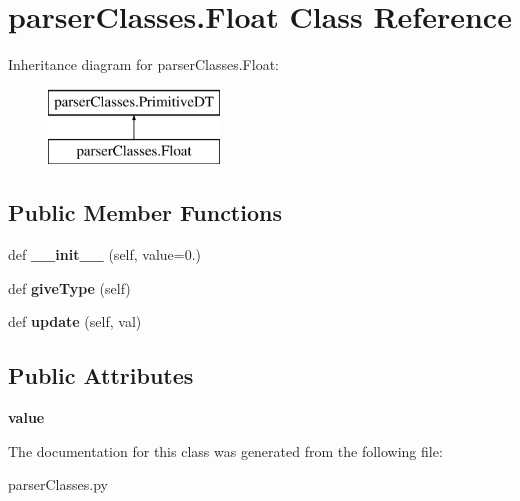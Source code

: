 \hypertarget{classparser_classes_1_1_float}{}\section{parser\+Classes.\+Float Class Reference}
\label{classparser_classes_1_1_float}
Inheritance diagram for parser\+Classes.\+Float\+:\begin{figure}[H]
\begin{center}
\leavevmode
\includegraphics[height=2.000000cm]{classparser_classes_1_1_float}
\end{center}
\end{figure}
\subsection*{Public Member Functions}
\begin{DoxyCompactItemize}
\item 
\mbox{\label{classparser_classes_1_1_float_a6b381bc911c79a2e93df1627ca2267df}} 
def {\bfseries \+\_\+\+\_\+init\+\_\+\+\_\+} (self, value=0.)
\item 
\mbox{\label{classparser_classes_1_1_float_a5570384fde83d172e3fe1b176be8521e}} 
def {\bfseries give\+Type} (self)
\item 
\mbox{\label{classparser_classes_1_1_float_a825903e0f131e7169e28fab644c26344}} 
def {\bfseries update} (self, val)
\end{DoxyCompactItemize}
\subsection*{Public Attributes}
\begin{DoxyCompactItemize}
\item 
\mbox{\label{classparser_classes_1_1_float_abb886ca1c6bbaa84a9b08d57db80b4c7}} 
{\bfseries value}
\end{DoxyCompactItemize}


The documentation for this class was generated from the following file\+:\begin{DoxyCompactItemize}
\item 
parser\+Classes.\+py\end{DoxyCompactItemize}
